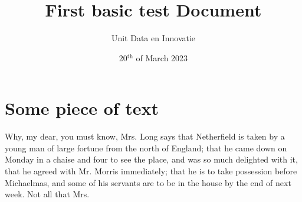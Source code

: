 \documentclass[10pt,a4paper]{report}
\title{First basic test Document}
\author{Unit Data en Innovatie}
\date{20${^{\textrm{th}}}$ of March 2023}
\begin{document}
 

\chapter{Some piece of text}

Why, my dear, you must know, Mrs. Long says that Netherfield is taken by a young
man of large fortune from the north of England; that he came down on Monday in a
chaise and four to see the place, and was so much delighted with it, that he agreed
with Mr. Morris immediately; that he is to take possession before Michaelmas, and
some of his servants are to be in the house by the end of next week. Not all that
Mrs.
\end{document}
